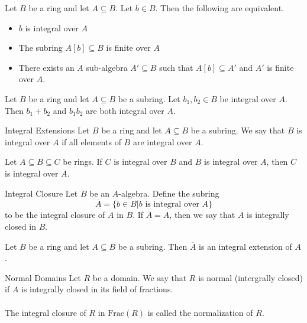 \documentclass[a4paper]{article}
\begin{document}
\begin{prp}{}{} Let $B$ be a ring and let $A\subseteq B$. Let $b\in B$. Then the following are equivalent. 
\begin{itemize}
\item $b$ is integral over $A$
\item The subring $A[b]\subseteq B$ is finite over $A$
\item There exists an $A$ sub-algebra $A'\subseteq B$ such that $A[b]\subseteq A'$ and $A'$ is finite over $A$. 
\end{itemize}
\end{prp}

\begin{prp}{}{} Let $B$ be a ring and let $A\subseteq B$ be a subring. Let $b_1,b_2\in B$ be integral over $A$. Then $b_1+b_2$ and $b_1b_2$ are both integral over $A$. 
\end{prp}

\begin{defn}{Integral Extensions}{} Let $B$ be a ring and let $A\subseteq B$ be a subring. We say that $B$ is integral over $A$ if all elements of $B$ are integral over $A$. 
\end{defn}

\begin{lmm}{}{} Let $A\subseteq B\subseteq C$ be rings. If $C$ is integral over $B$ and $B$ is integral over $A$, then $C$ is integral over $A$. 
\end{lmm}

\begin{defn}{Integral Closure}{} Let $B$ be an $A$-algebra. Define the subring $$\overline{A}=\{b\in B|b\text{ is integral over }A\}$$ to be the integral closure of $A$ in $B$. If $\overline{A}=A$, then we say that $A$ is integrally closed in $B$. 
\end{defn}

\begin{lmm}{}{} Let $B$ be a ring and let $A\subseteq B$ be a subring. Then $\overline{A}$ is an integral extension of $A$. 
\end{lmm}

\begin{defn}{Normal Domains}{} Let $R$ be a domain. We say that $R$ is normal (intergrally closed) if $A$ is integrally closed in its field of fractions. \\~\\
The integral closure of $R$ in $\text{Frac}(R)$ is called the normalization of $R$. 
\end{defn}
\end{document}
